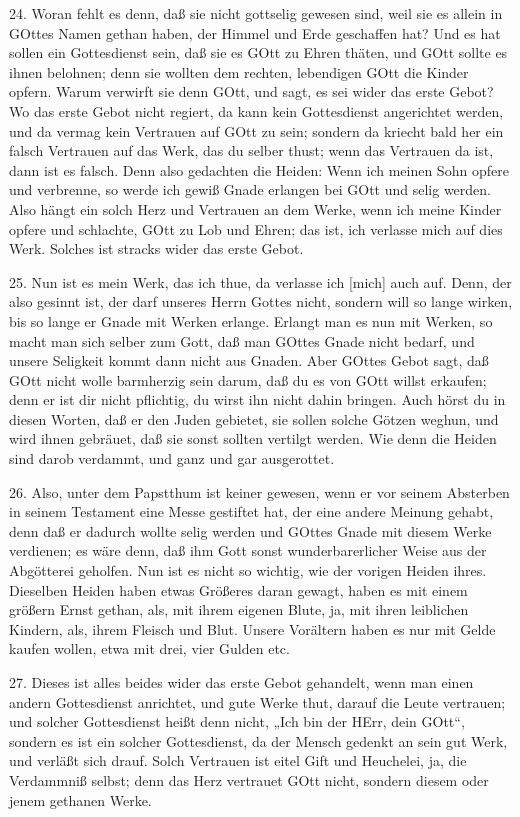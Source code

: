 24. Woran fehlt es denn, daß sie nicht gottselig gewesen sind, weil sie es allein in GOttes Namen gethan haben, der Himmel und Erde geschaffen hat? Und es hat sollen ein Gottesdienst sein, daß sie es GOtt zu Ehren thäten, und GOtt sollte es ihnen belohnen; denn sie wollten dem rechten, lebendigen GOtt die Kinder opfern. Warum verwirft sie denn GOtt, und sagt, es sei wider das erste Gebot? Wo das erste Gebot nicht regiert, da kann kein Gottesdienst angerichtet werden, und da vermag kein Vertrauen auf GOtt zu sein; sondern da kriecht bald her ein falsch Vertrauen auf das Werk, das du selber thust; wenn das Vertrauen da ist, dann ist es falsch. Denn also gedachten die Heiden: Wenn ich meinen Sohn opfere und verbrenne, so werde ich gewiß Gnade erlangen bei GOtt und selig werden. Also hängt ein solch Herz und Vertrauen an dem Werke, wenn ich meine Kinder opfere und schlachte, GOtt zu Lob und Ehren; das ist, ich verlasse mich auf dies Werk. Solches ist stracks wider das erste Gebot.

25. Nun ist es mein Werk, das ich thue, da verlasse ich [mich] auch auf. Denn, der also gesinnt ist, der darf unseres Herrn Gottes nicht, sondern will so lange wirken, bis so lange er Gnade mit Werken erlange. Erlangt man es nun mit Werken, so macht man sich selber zum Gott, daß man GOttes Gnade nicht bedarf, und unsere Seligkeit kommt dann nicht aus Gnaden. Aber GOttes Gebot sagt, daß GOtt nicht wolle barmherzig sein darum, daß du es von GOtt willst erkaufen; denn er ist dir nicht pflichtig, du wirst ihn nicht dahin bringen. Auch hörst du in diesen Worten, daß er den Juden gebietet, sie sollen solche Götzen weghun, und wird ihnen gebräuet, daß sie sonst sollten vertilgt werden. Wie denn die Heiden sind darob verdammt, und ganz und gar ausgerottet.

26. Also, unter dem Papstthum ist keiner gewesen, wenn er vor seinem Absterben in seinem Testament eine Messe gestiftet hat, der eine andere Meinung gehabt, denn daß er dadurch wollte selig werden und GOttes Gnade mit diesem Werke verdienen; es wäre denn, daß ihm Gott sonst wunderbarerlicher Weise aus der Abgötterei geholfen. Nun ist es nicht so wichtig, wie der vorigen Heiden ihres. Dieselben Heiden haben etwas Größeres daran gewagt, haben es mit einem größern Ernst gethan, als, mit ihrem eigenen Blute, ja, mit ihren leiblichen Kindern, als, ihrem Fleisch und Blut. Unsere Vorältern haben es nur mit Gelde kaufen wollen, etwa mit drei, vier Gulden etc.

27. Dieses ist alles beides wider das erste Gebot gehandelt, wenn man einen andern Gottesdienst anrichtet, und gute Werke thut, darauf die Leute vertrauen; und solcher Gottesdienst heißt denn nicht, „Ich bin der HErr, dein GOtt“, sondern es ist ein solcher Gottesdienst, da der Mensch gedenkt an sein gut Werk, und verläßt sich drauf. Solch Vertrauen ist eitel Gift und Heuchelei, ja, die Verdammniß selbst; denn das Herz vertrauet GOtt nicht, sondern diesem oder jenem gethanen Werke.

